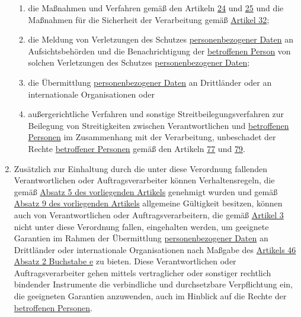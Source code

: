 \begin{enumerate}
\begin{enumerate}
    \item die Maßnahmen und Verfahren gemäß den Artikeln \hyperref[ch:24]{24} und \hyperref[ch:25]{25} und die Maßnahmen
     für die Sicherheit der Verarbeitung gemäß \hyperref[ch:32]{Artikel 32};
    \label{itm:40-2h}

    \item die Meldung von Verletzungen des Schutzes \hyperref[itm:04-1]{personenbezogener Daten} an Aufsichtsbehörden und die
     Benachrichtigung der \hyperref[itm:04-1]{betroffenen Person} von solchen Verletzungen des Schutzes \hyperref[itm:04-1]{personenbezogener Daten};
    \label{itm:40-2i}

    \item die Übermittlung \hyperref[itm:04-1]{personenbezogener Daten} an Drittländer oder an internationale Organisationen oder
    \label{itm:40-2j}

    \item außergerichtliche Verfahren und sonstige Streitbeilegungsverfahren zur Beilegung von Streitigkeiten zwischen
     Verantwortlichen und \hyperref[itm:04-1]{betroffenen Personen} im Zusammenhang mit der Verarbeitung, unbeschadet der Rechte \hyperref[itm:04-1]{betroffener
     Personen} gemäß den Artikeln \hyperref[ch:77]{77} und \hyperref[ch:79]{79}.
    \label{itm:40-2k}

  \end{enumerate}

  \item Zusätzlich zur Einhaltung durch die unter diese Verordnung fallenden Verantwortlichen oder Auftragsverarbeiter
   können Verhaltensregeln, die gemäß \hyperref[itm:40-5]{Absatz 5 des vorliegenden Artikels} genehmigt wurden und
   gemäß \hyperref[itm:40-9]{Absatz 9 des vorliegenden Artikels} allgemeine Gültigkeit besitzen, können auch von
   Verantwortlichen oder Auftragsverarbeitern, die gemäß \hyperref[ch:3]{Artikel 3} nicht unter diese Verordnung
   fallen, eingehalten werden, um geeignete Garantien im Rahmen der Übermittlung \hyperref[itm:04-1]{personenbezogener Daten} an Drittländer
   oder internationale Organisationen nach Maßgabe des \hyperref[itm:46-2e]{Artikels 46 Absatz 2 Buchstabe e} zu
   bieten. Diese Verantwortlichen oder Auftragsverarbeiter gehen mittels vertraglicher oder sonstiger rechtlich
   bindender Instrumente die verbindliche und durchsetzbare Verpflichtung ein, die geeigneten Garantien anzuwenden,
   auch im Hinblick auf die Rechte der \hyperref[itm:04-1]{betroffenen Personen}.
  \label{itm:40-3}


\end{enumerate}
